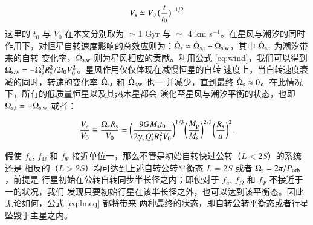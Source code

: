 \begin{equation} \label{eq:wind}
V_\mathrm{s} \simeq  V_0 \,\big( \frac{t}{t_0} \big)^{-1/2}
\end{equation} 
这里的 $t_0$ 与 $V_0$ 在本文分别取为 $\simeq$1 Gyr 与 $\simeq$ 4 km s$^{-1}$。在星风与潮汐的同时
作用下\cite{DobbsDixon2004,Dawson2014}，对恒星自转速度影响的总效应则为：$\dot{\Omega}_\mathrm{s} 
\simeq \dot{\Omega}_\mathrm{s, t} + \dot{\Omega}_\mathrm{s, w}$，其中 $\dot{\Omega}_\mathrm{s, t}$ 为潮汐带来的自转
变化率，$\dot{\Omega}_\mathrm{s, w}$ 则为星风相应的贡献。利用公式 \ref{eq:wind}，我们可以得到 
$\dot{\Omega}_\mathrm{s, w} = -\Omega_\mathrm{s}^3 R_\mathrm{s}^2/2 t_0 V_0^2$。星风作用仅仅体现在减慢恒星的自转
速度上，当自转速度衰减的同时，转速的变化率 $ \dot{\Omega}_\mathrm{s, t}$ 和 $\dot{\Omega}_\mathrm{s, w}$ 也一
并减少，直到最终 $ \dot{\Omega}_\mathrm{s} \approx 0 $。在此情况下，所有的低质量恒星以及其热木星都会
演化至星风与潮汐平衡的状态，也即 $\dot{\Omega}_\mathrm{s, t} = - \dot{\Omega}_\mathrm{s, w}$ 或者：

\begin{equation} \label{eq:lmeq}
{V_e \over V_0} \equiv \frac{\Omega_eR_\mathrm{s}}{V_0} = \bigg( \frac{9G M_\mathrm{s}t_0}
{2 \gamma_\mathrm{s}Q_\mathrm{s}^{\prime}R_\mathrm{s}^2V_0} \bigg)^{1/3} \bigg( \frac{M_\mathrm{p}}
{M_\mathrm{s}} \bigg)^{2/3} \bigg( \frac{R_\mathrm{s}}{a} \bigg)^2.
\end{equation}  

假使 $f_a$, $f_\Omega$ 和 $f_\Psi$ 接近单位一，那么不管是初始自转快过公转（$L<2S$）的系统还是
相反的（$L>2S$）均可达到上述自转公转平衡态 $L=2S$ 或者 $\Omega_\mathrm{s} = 2\pi /P_\mathrm{orb}$，前提是
行星初始在公转自转同步半长径之内；即使对于 $f_a$, $f_\Omega$ 和 $f_\Psi$ 不接近于一的状况，我们
发现只要初始行星在该半长径之外，也可以达到该平衡态。因此无论如何，公式 \ref{eq:lmeq} 都将带来
两种最终的状态，即自转公转平衡态或者行星坠毁于主星之内。

